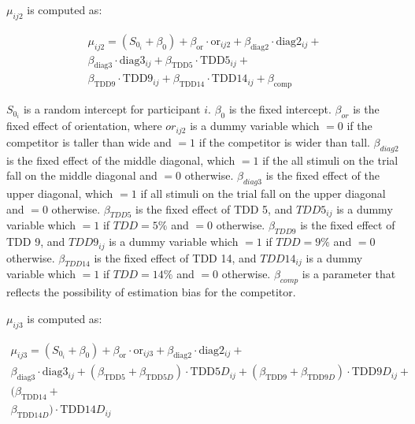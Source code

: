 $\mu_{ij2}$ is computed as:

\begin{equation}
    \begin{aligned}
        \mu_{ij2}=(S_{0_i} + \beta_{0}) + \beta_{\mathrm{or}} \cdot \mathrm{or}_{ij2} + \beta_{\mathrm{diag}2} \cdot \mathrm{diag}2_{ij}+ \\\beta_{\mathrm{diag}3} \cdot \mathrm{diag}3_{ij} + \beta_{\mathrm{TDD}5} \cdot \mathrm{TDD}5_{ij} + \\\beta_{\mathrm{TDD}9} \cdot \mathrm{TDD}9_{ij} + \beta_{\mathrm{TDD}14} \cdot \mathrm{TDD}14_{ij} + \beta_{\mathrm{comp}}
        \label{circle_mu_eqn2}
    \end{aligned}
\end{equation}

$S_{0_i}$ is a random intercept for participant $i$. $\beta_{0}$ is the fixed intercept. $\beta_{or}$ is the fixed effect of orientation, where $or_{ij2}$ is a dummy variable which $=0$ if the competitor is taller than wide and $=1$ if the competitor is wider than tall. $\beta_{diag2}$ is the fixed effect of the middle diagonal, which $=1$ if the all stimuli on the trial fall on the middle diagonal and $=0$ otherwise. $\beta_{diag3}$ is the fixed effect of the upper diagonal, which $=1$ if all stimuli on the trial fall on the upper diagonal and $=0$ otherwise. $\beta_{TDD5}$ is the fixed effect of TDD 5, and $TDD5_{ij}$ is a dummy variable which $=1$ if $TDD=5\%$ and $=0$ otherwise. $\beta_{TDD9}$ is the fixed effect of TDD 9, and $TDD9_{ij}$ is a dummy variable which $=1$ if $TDD=9\%$ and $=0$ otherwise. $\beta_{TDD14}$ is the fixed effect of TDD 14, and $TDD14_{ij}$ is a dummy variable which $=1$ if $TDD=14\%$ and $=0$ otherwise. $\beta_{comp}$ is a parameter that reflects the possibility of estimation bias for the competitor.

$\mu_{ij3}$ is computed as:

\begin{equation}
    \begin{aligned}
        \mu_{ij3}=(S_{0_i} + \beta_{0}) + \beta_{\mathrm{or}} \cdot \mathrm{or}_{ij3} + \beta_{\mathrm{diag}2} \cdot \mathrm{diag}2_{ij}+ \\\beta_{\mathrm{diag}3} \cdot \mathrm{diag}3_{ij} + (\beta_{\mathrm{TDD}5} + \beta_{\mathrm{TDD}5D}) \cdot \mathrm{TDD}5D_{ij} + (\beta_{\mathrm{TDD}9} + \beta_{\mathrm{TDD}9D}) \cdot \mathrm{TDD}9D_{ij} +\\ (\beta_{\mathrm{TDD}14} +\\ \beta_{\mathrm{TDD}14D}) \cdot \mathrm{TDD}14D_{ij}
        \label{circle_mu_eqn3}
    \end{aligned}
\end{equation}


